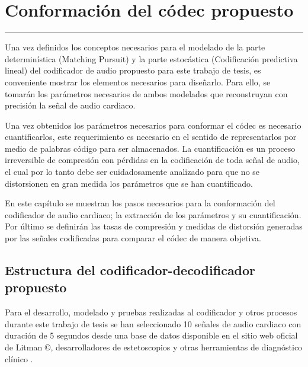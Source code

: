 
\chapter{Conformación del códec propuesto}\label{capit:cap5}
\vspace{-2.0325ex}%
\noindent
\rule{\textwidth}{0.5pt}
\vspace{-5.5ex}%
\newcommand{\pushline}{\Indp}%

Una vez definidos los conceptos necesarios para el modelado de la parte determinística (Matching Pursuit) y la parte estocástica (Codificación predictiva lineal) del codificador de audio propuesto para este trabajo de tesis, es conveniente mostrar los elementos necesarios para diseñarlo. Para ello, se tomarán los parámetros necesarios de ambos modelados que reconstruyan con precisión la señal de audio cardiaco. 

Una vez obtenidos los parámetros necesarios para conformar el códec es necesario cuantificarlos, este requerimiento es necesario en el sentido de representarlos por medio de palabras código para ser almacenados. La cuantificación es un proceso irreversible de compresión con pérdidas en la codificación de toda señal de audio, el cual por lo tanto debe ser cuidadosamente analizado para que no se distorsionen en gran medida los parámetros que se han cuantificado.

En este capítulo se muestran los pasos necesarios para la conformación del codificador de audio cardiaco; la extracción de los parámetros y su cuantificación. Por último se definirán las tasas de compresión y medidas de distorsión generadas por las señales codificadas para comparar el códec de manera objetiva. 

\section{Estructura del codificador-decodificador propuesto}
Para el desarrollo, modelado y pruebas realizadas al codificador y otros procesos durante este trabajo de tesis se han seleccionado 10 señales de audio cardiaco con duración de 5 segundos desde una base de datos disponible en el sitio web oficial de Litman \copyright, desarrolladores de estetoscopios y otras herramientas de diagnóstico clínico \cite[]{LitmannBase}.

